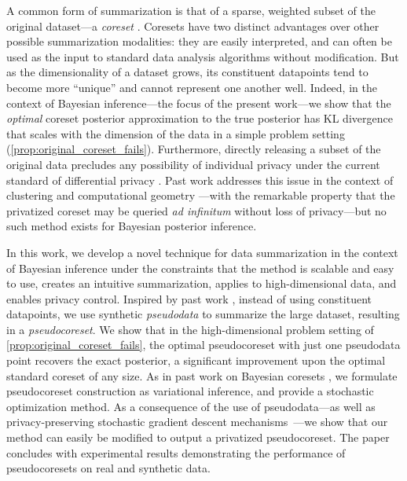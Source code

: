 A common form of summarization is that of a sparse, weighted subset of the original dataset---a \emph{coreset} \citep{agarwal05}. 
Coresets have two distinct advantages over other possible summarization modalities: they are easily interpreted, and can often be used
as the input to standard data analysis algorithms without modification. 
But as the dimensionality of a dataset grows, its constituent 
datapoints tend to become more ``unique'' and cannot represent one another well. Indeed, in the context of Bayesian inference---the focus of the
present work---we show that the \emph{optimal} coreset posterior approximation to the true posterior has KL divergence that scales with the dimension 
of the data in a simple problem setting (\cref{prop:original_coreset_fails}). 
Furthermore, directly releasing a subset of the original data precludes any possibility of
individual privacy under the current standard 
of differential privacy \citep{dwork2006calibrating,dwork14}. Past work
addresses this issue in the context of clustering and computational geometry \citep{feldman09,feldman17}---with
the remarkable property that the privatized coreset may be queried \emph{ad infinitum} without
loss of privacy---but no such method exists for Bayesian posterior inference.

In this work, we develop a novel technique for data summarization in the context of Bayesian inference under the constraints that the method 
is scalable and easy to use, creates an intuitive summarization, applies to high-dimensional data, and enables privacy control.
Inspired by past work \citep{madigan02,zhou08,snelson05}, instead of using constituent datapoints, we use synthetic \emph{pseudodata} to summarize the large dataset, resulting in a \emph{pseudocoreset}. We show that in the high-dimensional problem setting of \cref{prop:original_coreset_fails}, 
the optimal pseudocoreset with just one pseudodata point recovers the exact posterior, a significant improvement upon the optimal standard coreset of any size.
As in past work on Bayesian coresets \citep{campbell19neurips}, we formulate pseudocoreset construction as variational inference, 
and provide a stochastic optimization method. As a consequence of the use of pseudodata---as well as privacy-preserving 
stochastic gradient descent mechanisms~\citep{abadi16,park16, jalko17}---we show that our method can easily be modified to output
a privatized pseudocoreset. The paper concludes with experimental results demonstrating the performance of pseudocoresets on 
real and synthetic data.
